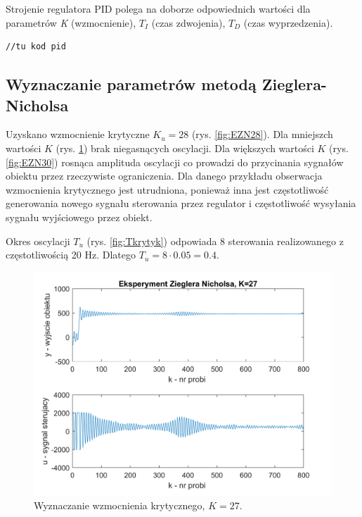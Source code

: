 \documentclass[a4paper, 10pt]{article}
\begin{document}
Strojenie regulatora PID polega na doborze odpowiednich wartości dla parametrów \textit{K} (wzmocnienie), $T_{I}$ (czas zdwojenia), $T_{D}$ (czas wyprzedzenia). 


\begin{lstlisting}[caption={Kod realizujący regulator PID}]
//tu kod pid
\end{lstlisting}

\subsection{Wyznaczanie parametrów metodą Zieglera-Nicholsa}
Uzyskano wzmocnienie krytyczne $K_u=28$ (rys. \ref{fig:EZN28}). Dla mniejszch wartości $K$ (rys. \ref{fig:EZN27}) brak niegasnących oscylacji. Dla większych wartości $K$ (rys. \ref{fig:EZN30}) rosnąca amplituda oscylacji co prowadzi do przycinania sygnałów obiektu przez rzeczywiste ograniczenia. Dla danego przykładu obserwacja wzmocnienia krytycznego jest utrudniona, ponieważ inna jest częstotliwość generowania nowego sygnału sterowania przez regulator i częstotliwość wysyłania sygnału wyjściowego przez obiekt.

Okres oscylacji $T_u$ (rys. \ref{fig:Tkrytyk}) odpowiada 8 sterowania realizowanego z częstotliwością 20 Hz. Dlatego $T_u = 8 \cdot 0.05 = 0.4$.

\begin{figure}[H]
	\centering
	\includegraphics[width=0.9\linewidth]{EZN27}
	\caption{Wyznaczanie wzmocnienia krytycznego, $K = 27$.}
	\label{fig:EZN27}
\end{figure}
\end{document}
